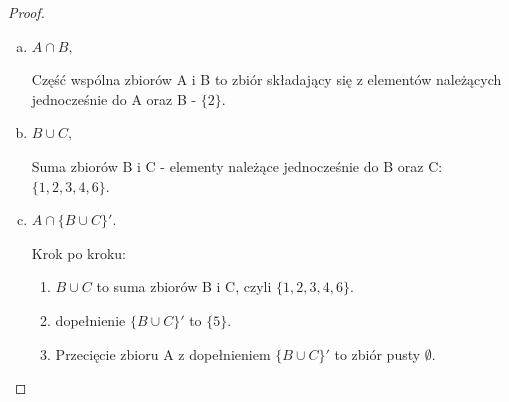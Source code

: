 \documentclass[11pt]{article}
\theoremstyle{definition}
\numberwithin{zadanie}{section}
\begin{document}
\begin{proof}
    \begin{enumerate}[a)]
        \item $A \cap B,$

              Część wspólna zbiorów A i B to zbiór składający się z elementów należących jednocześnie do A oraz B - $\{2\}$.

        \item $B \cup C,$

              Suma zbiorów B i C - elementy należące jednocześnie do B oraz C: $\{1,2,3,4,6\}$.

        \item $A \cap \{B \cup C\}'.$

              Krok po kroku:
              \begin{enumerate}
                  \item $B\cup C$ to suma zbiorów B i C, czyli $\{1,2,3,4,6\}$.
                  \item dopełnienie $\{B\cup C\}'$ to $\{5\}$.
                  \item Przecięcie zbioru A z dopełnieniem $\{B\cup C\}'$ to zbiór pusty $\emptyset$.
              \end{enumerate}
    \end{enumerate}
\end{proof}
\end{document}

